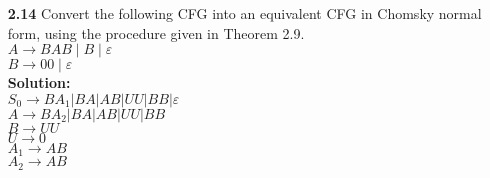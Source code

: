 \documentclass[12pt]{letter}
\newcommand\tab[1][2cm]{\hspace*{#1}}
\begin{document}
\begin{enumerate}
\ \\ %
\item[\textbf{2.14}] Convert the following CFG into an equivalent CFG in Chomsky normal form, using the procedure given in Theorem 2.9.\\
	\tab \tab $A \rightarrow BAB \mid B \mid \varepsilon$ \\
	\tab \tab $B \rightarrow 00 \mid \varepsilon$ \\
\textbf{Solution:} \\
	\tab $S_0 \rightarrow BA_1 |BA|AB|UU|BB| \varepsilon $ \\ 
	\tab $A \rightarrow BA_2 | BA |AB |UU |BB $ \\
	\tab $B \rightarrow UU $ \\ 
	\tab $U \rightarrow 0 $ \\ 
	\tab $A_1 \rightarrow AB $ \\
	\tab $A_2 \rightarrow AB $ \\


\end{enumerate}
\end{document}
